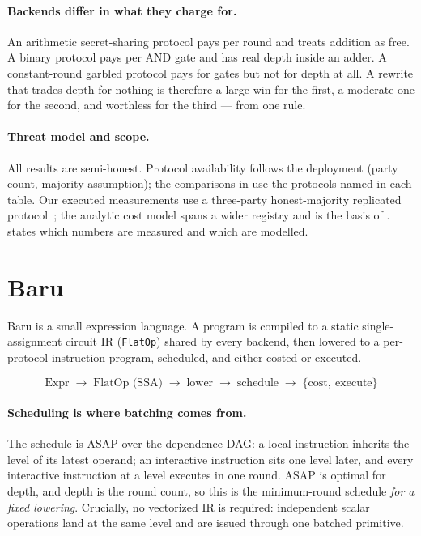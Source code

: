 \documentclass[11pt]{article}
\newcommand{\bt}[1]{\texttt{#1}}
\begin{document}
\paragraph{Backends differ in what they charge for.} An arithmetic
secret-sharing protocol pays per round and treats addition as free. A binary
protocol pays per AND gate and has real depth inside an adder. A
constant-round garbled protocol pays for gates but not for depth at all. A
rewrite that trades depth for nothing is therefore a large win for the first,
a moderate one for the second, and worthless for the third --- from one rule.

\paragraph{Threat model and scope.} All results are semi-honest. Protocol
availability follows the deployment (party count, majority assumption); the
comparisons in  use the protocols named in each table. Our
executed measurements use a three-party honest-majority replicated protocol~\cite{ABY3};
the analytic cost model spans a wider registry and is the basis of
.  states which numbers are
measured and which are modelled.

\section{Baru}\label{sec:design}

Baru is a small expression language. A program is compiled to a static
single-assignment circuit IR (\bt{FlatOp}) shared by every backend, then
lowered to a per-protocol instruction program, scheduled, and either costed or
executed.

\[
\text{Expr} \;\to\; \text{FlatOp (SSA)} \;\to\; \text{lower} \;\to\;
\text{schedule} \;\to\; \{\text{cost},\ \text{execute}\}
\]

\paragraph{Scheduling is where batching comes from.} The schedule is ASAP over
the dependence DAG: a local instruction inherits the level of its latest
operand; an interactive instruction sits one level later, and every
interactive instruction at a level executes in one round. ASAP is optimal for
depth, and depth is the round count, so this is the minimum-round schedule
\emph{for a fixed lowering}. Crucially, no vectorized IR is required:
independent scalar operations land at the same level and are issued through
one batched primitive.
\end{document}
